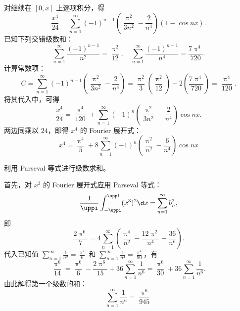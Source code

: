 \begin{solution}

    对继续在 $[0, x]$ 上逐项积分，得
    \begin{equation}\label{eq:int-x4}
        \frac{x^4}{24} = \sum_{n=1}^{\infty} (-1)^{n-1} \left( \frac{\uppi^2}{3n^2} - \frac{2}{n^4} \right) (1 - \cos nx).
    \end{equation}
    已知下列交错级数和：
    \begin{equation}\label{eq:eta2-4}
        \sum_{n=1}^{\infty} \frac{(-1)^{n-1}}{n^2} = \frac{\uppi^2}{12}, \quad \sum_{n=1}^{\infty} \frac{(-1)^{n-1}}{n^4} = \frac{7\uppi^4}{720}.
    \end{equation}
    计算常数项：
    \begin{equation}\label{eq:const-x4}
        C = \sum_{n=1}^{\infty} (-1)^{n-1} \left( \frac{\uppi^2}{3n^2} - \frac{2}{n^4} \right) = \frac{\uppi^2}{3} \left( \frac{\uppi^2}{12} \right) - 2 \left( \frac{7\uppi^4}{720} \right) = \frac{\uppi^4}{120}.
    \end{equation}
    将其代入中，可得
    \begin{equation}\label{eq:x4-fraction}
        \frac{x^4}{24} = \frac{\uppi^4}{120} + \sum_{n=1}^{\infty} (-1)^n \left( \frac{\uppi^2}{3n^2} - \frac{2}{n^4} \right) \cos nx.
    \end{equation}
    两边同乘以 $24$，即得 $x^4$ 的 Fourier 展开式：
    \begin{equation}
        \boxed{x^4 = \frac{\uppi^4}{5} + 8 \sum_{n=1}^{\infty} (-1)^n \left( \frac{\uppi^2}{n^2} - \frac{6}{n^4} \right) \cos nx}
    \end{equation}


    利用 Parseval 等式进行级数求和。

    首先，对 $x^3$ 的 Fourier 展开式应用 Parseval 等式：
    \begin{equation}\label{eq:parseval-x3}
        \frac{1}{\uppi} \int_{-\uppi}^{\uppi} (x^3)^2 \d x = \sum_{n=1}^{\infty} b_n^2,
    \end{equation}
    即
    \begin{equation}\label{eq:parseval-x3-calc}
        \frac{2\uppi^6}{7} = 4 \sum_{n=1}^{\infty} \left( \frac{\uppi^4}{n^2} - \frac{12\uppi^2}{n^4} + \frac{36}{n^6} \right).
    \end{equation}
    代入已知值 $\sum_{n=1}^{\infty} \frac{1}{n^2} = \frac{\uppi^2}{6}$ 和 $\sum_{n=1}^{\infty} \frac{1}{n^4} = \frac{\uppi^4}{90}$，有
    \begin{equation}\label{eq:parseval-x3-subs}
        \frac{\uppi^6}{14} = \frac{\uppi^6}{6} - \frac{2\uppi^6}{15} + 36 \sum_{n=1}^{\infty} \frac{1}{n^6} = \frac{\uppi^6}{30} + 36 \sum_{n=1}^{\infty} \frac{1}{n^6}.
    \end{equation}
    由此解得第一个级数的和：
    \begin{equation}
        \boxed{\sum_{n=1}^{\infty} \frac{1}{n^6} = \frac{\uppi^6}{945}}
    \end{equation}


\end{solution}
